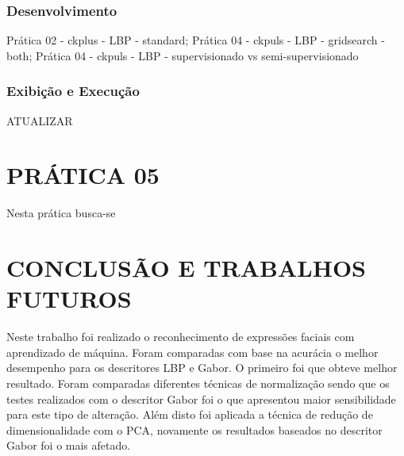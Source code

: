 \documentclass[a4paper, 12 pt, conference]{ieeeconf}  %
\begin{document}
\subsubsection{Desenvolvimento} Prática 02 - ckplus  - LBP - standard; Prática 04 - ckpuls - LBP - gridsearch - both; Prática 04 - ckpuls - LBP - supervisionado vs  semi-supervisionado
\subsubsection{Exibição e Execução} ATUALIZAR

\section{PRÁTICA 05}
\label{pratica05}

Nesta prática busca-se
\section{CONCLUSÃO E TRABALHOS FUTUROS}

Neste trabalho foi realizado o reconhecimento de expressões faciais com aprendizado de máquina. Foram comparadas com base na acurácia o melhor desempenho para os descritores LBP e Gabor. O primeiro foi que obteve melhor resultado. Foram comparadas diferentes técnicas de normalização sendo que os testes realizados com o descritor Gabor foi o que apresentou maior sensibilidade para este tipo de alteração. Além disto foi aplicada a técnica de redução de dimensionalidade com o PCA, novamente os resultados baseados no descritor Gabor foi o mais afetado.



\end{document}

